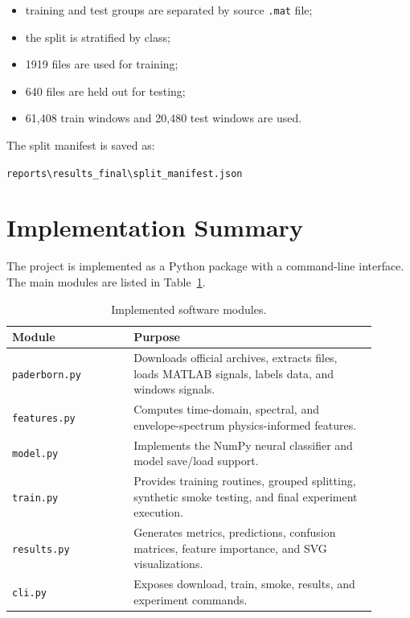 \documentclass[11pt,a4paper]{article}
\begin{document}
\begin{itemize}[leftmargin=2em]
    \item training and test groups are separated by source \texttt{.mat} file;
    \item the split is stratified by class;
    \item 1919 files are used for training;
    \item 640 files are held out for testing;
    \item 61,408 train windows and 20,480 test windows are used.
\end{itemize}

The split manifest is saved as:
\begin{center}
\texttt{reports\textbackslash results\_final\textbackslash split\_manifest.json}
\end{center}

\section{Implementation Summary}
The project is implemented as a Python package with a command-line interface. The main modules are listed in Table~\ref{tab:modules}.

\begin{table}[H]
\centering
\caption{Implemented software modules.}
\label{tab:modules}
\begin{tabular}{p{0.30\linewidth}p{0.60\linewidth}}
\toprule
\textbf{Module} & \textbf{Purpose} \\
\midrule
\texttt{paderborn.py} & Downloads official archives, extracts files, loads MATLAB signals, labels data, and windows signals. \\
\texttt{features.py} & Computes time-domain, spectral, and envelope-spectrum physics-informed features. \\
\texttt{model.py} & Implements the NumPy neural classifier and model save/load support. \\
\texttt{train.py} & Provides training routines, grouped splitting, synthetic smoke testing, and final experiment execution. \\
\texttt{results.py} & Generates metrics, predictions, confusion matrices, feature importance, and SVG visualizations. \\
\texttt{cli.py} & Exposes download, train, smoke, results, and experiment commands. \\
\bottomrule
\end{tabular}
\end{table}
\end{document}
